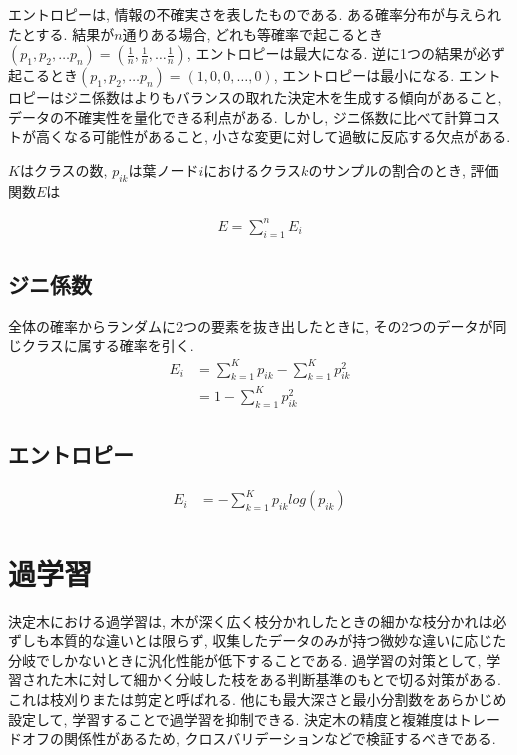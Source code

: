 \documentclass[dvipdfmx, 10pt]{jsarticle}
\begin{document}
エントロピーは, 情報の不確実さを表したものである. ある確率分布が与えられたとする. 
結果が\(n\)通りある場合, どれも等確率で起こるとき\((p_1, p_2, \dots p_n) = (\frac{1}{n}, \frac{1}{n}, \dots \frac{1}{n})\), 
エントロピーは最大になる. 
逆に1つの結果が必ず起こるとき\((p_1, p_2, \dots p_n) = (1, 0, 0, \dots ,0)\), エントロピーは最小になる. 
エントロピーはジニ係数はよりもバランスの取れた決定木を生成する傾向があること, データの不確実性を量化できる利点がある. 
しかし, ジニ係数に比べて計算コストが高くなる可能性があること, 小さな変更に対して過敏に反応する欠点がある. 

\begin{oframed}

\(K\)はクラスの数, \(p_{ik}\)は葉ノード\(i\)におけるクラス\(k\)のサンプルの割合のとき, 評価関数\(E\)は

\begin{align*}
    E = \sum_{i=1}^{n} E_i
\end{align*}

\subsection*{ジニ係数}
全体の確率からランダムに2つの要素を抜き出したときに, その2つのデータが同じクラスに属する確率を引く. 
\begin{align*}
    E_i 
    &= \sum_{k=1}^{K} p_{ik} - \sum_{k=1}^{K} p_{ik}^2 \\
    &= 1 - \sum_{k=1}^{K} p_{ik}^2
\end{align*}

\subsection*{エントロピー}
\begin{align*}
    E_i
    &= - \sum_{k=1}^{K} p_{ik} log(p_{ik})
\end{align*}

\end{oframed}

\section*{過学習}
決定木における過学習は, 木が深く広く枝分かれしたときの細かな枝分かれは必ずしも本質的な違いとは限らず, 
収集したデータのみが持つ微妙な違いに応じた分岐でしかないときに汎化性能が低下することである. 
過学習の対策として, 学習された木に対して細かく分岐した枝をある判断基準のもとで切る対策がある. 
これは枝刈りまたは剪定と呼ばれる. 他にも最大深さと最小分割数をあらかじめ設定して, 学習することで過学習を抑制できる. 
決定木の精度と複雑度はトレードオフの関係性があるため, クロスバリデーションなどで検証するべきである. 
\end{document}
